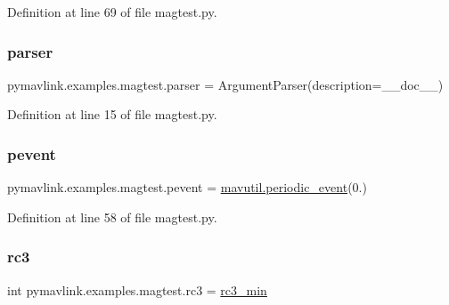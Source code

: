 Definition at line 69 of file magtest.\+py.

\mbox{\label{namespacepymavlink_1_1examples_1_1magtest_a783ce71ad67e0f1debb63c6d8779babb}} 
\subsubsection{\texorpdfstring{parser}{parser}}
{\footnotesize\ttfamily pymavlink.\+examples.\+magtest.\+parser = Argument\+Parser(description=\+\_\+\+\_\+doc\+\_\+\+\_\+)}



Definition at line 15 of file magtest.\+py.

\mbox{\label{namespacepymavlink_1_1examples_1_1magtest_a8556daa189241634467717d1fc5477d0}} 
\subsubsection{\texorpdfstring{pevent}{pevent}}
{\footnotesize\ttfamily pymavlink.\+examples.\+magtest.\+pevent = \mbox{\hyperlink{classpymavlink_1_1mavutil_1_1periodic__event}{mavutil.\+periodic\+\_\+event}}(0.)}



Definition at line 58 of file magtest.\+py.

\mbox{\label{namespacepymavlink_1_1examples_1_1magtest_a5f4f85280403824f4515003203b490b6}} 
\subsubsection{\texorpdfstring{rc3}{rc3}}
{\footnotesize\ttfamily int pymavlink.\+examples.\+magtest.\+rc3 = \mbox{\hyperlink{namespacepymavlink_1_1examples_1_1magtest_af92d1c950ac101b69806b7714ce9ae92}{rc3\+\_\+min}}}



